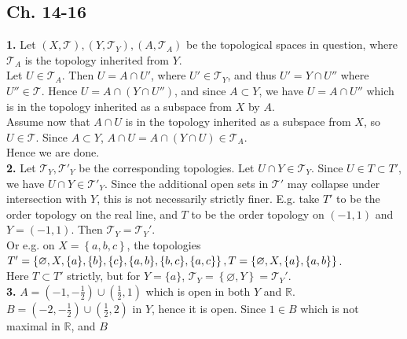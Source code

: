 \documentclass[a4paper]{article}
\begin{document}
    \subsection{Ch. 14-16}
    \textbf{1.} 
        Let $(X,\mathcal{T}), (Y, \mathcal{T}_Y), (A, \mathcal{T}_A)$ be the
        topological spaces in question, where $\mathcal{T}_A$ is the topology
        inherited from $Y$.\\
        Let $U \in \mathcal{T}_A$. Then $U= A \cap U'$, where $U' \in
        \mathcal{T}_Y$, and thus $U' = Y \cap U''$ where $U'' \in \mathcal{T}$.
        Hence
        $U = A \cap \left( Y \cap  U'' \right) $, and since $A \subset Y$, we
        have
        $U = A \cap U''$ which is in the topology inherited as a subspace from
        $X$ by $A$.\\
        Assume now that $A \cap U$ is in the topology inherited as a subspace
        from $X$, so $U \in \mathcal{T}$. Since $A \subset Y$, $A \cap
        U = A \cap \left( Y \cap U \right) \in \mathcal{T}_A$.\\ Hence we are
        done.\\
        \linebreak
        \textbf{2.} Let $\mathcal{T}_Y, \mathcal{T'}_Y$ be the corresponding
        topologies. Let $U \cap Y \in \mathcal{T}_Y$. Since $U \in T \subset
        T'$, we have $U \cap Y \in \mathcal{T'}_Y$. Since the additional open
        sets in $\mathcal{T}'$ may collapse under intersection with $Y$, this
        is not necessarily strictly finer. E.g. take $T'$ to be the order
        topology on the real line, and $T$ to be the order topology on
        $(-1,1)$ and $Y = (-1,1)$. Then $\mathcal{T}_Y = \mathcal{T}_Y'$.\\
        Or e.g. on $X=\left\{ a,b,c \right\} $, the topologies
        $T' = \left\{ \varnothing, X, \{a\}, \{b\}, \{c\}, \{a,b\}, \{b,c\},
            \{a,c\}
        \right\},\\
        T = \left\{ \varnothing, X, \{a\}, \{a,b\} \right\}  $.\\
        Here $T \subset T'$ strictly, but for $Y= \{a\}$, $\mathcal{T}_Y = \left\{ \varnothing,
        Y \right\} 
        = \mathcal{T}_Y'$.\\
        \linebreak
        \textbf{3.} $A = \left(-1, -\frac{1}{2} \right) \cup (\frac{1}{2},1)$
        which is open in both $Y$ and $\mathbb{R}$.\\
        $B = (-2, -\frac{1}{2}) \cup (\frac{1}{2}, 2)$ in $Y$, hence it is
        open. Since $1 \in B$ which is not maximal in $\mathbb{R}$, and $B$ 
\end{document}
